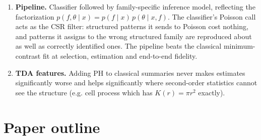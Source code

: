 \documentclass[11pt]{article}
\begin{document}
\begin{enumerate}
  \item \textbf{Pipeline.} Classifier followed by family-specific inference model, reflecting the factorization $p(f,\theta\mid x)=p(f\mid x)\,p(\theta\mid x,f)$. The classifier's Poisson call acts as the CSR filter: structured patterns it sends to Poisson cost nothing, and patterns it assigns to the wrong structured family are reproduced about as well as correctly identified ones. The pipeline beats the classical minimum-contrast fit at selection, estimation and end-to-end fidelity.
  \item \textbf{TDA features.} Adding PH to classical summaries never makes estimates significantly worse and helps significantly where second-order statistics cannot see the structure (e.g. cell process which has $K(r)=\pi r^2$ exactly).
\end{enumerate}

\newpage


\section*{Paper outline}
\end{document}
